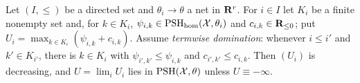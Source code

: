 \begin{theorem}\label{thm:nn-hom-max-diagonal}
\leanok
{}
Let $(I,\le)$ be a directed set and $\theta_i\to\theta$ a net in $\mathbf{R}^r$. For $i\in I$ let $K_i$ be a finite nonempty set and, for $k\in K_i$,
$\psi_{i,k}\in\operatorname{PSH}_{\mathrm{hom}}(\mathcal X,\theta_i)$ and $c_{i,k}\in\mathbf{R}_{\le0}$; put $U_i=\max_{k\in K_i}(\psi_{i,k}+c_{i,k})$. Assume \emph{termwise domination}:
whenever $i\le i'$ and $k'\in K_{i'}$, there is $k\in K_i$ with $\psi_{i',k'}\le\psi_{i,k}$ and $c_{i',k'}\le c_{i,k}$. Then $(U_i)$ is decreasing, and
$U=\lim_iU_i$ lies in $\operatorname{PSH}(\mathcal X,\theta)$ unless $U\equiv-\infty$.
\end{theorem}


